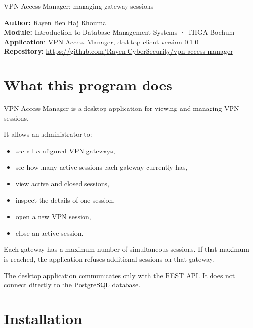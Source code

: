 \documentclass[11pt,a4paper]{article}
\begin{document}
\thispagestyle{empty}

%
{VPN Access Manager: managing gateway sessions}

\begin{infobox}
\textbf{Author:} Rayen Ben Haj Rhouma \\
\textbf{Module:} Introduction to Database Management Systems · THGA Bochum \\
\textbf{Application:} VPN Access Manager, desktop client version 0.1.0 \\
\textbf{Repository:} \url{https://github.com/Rayen-CyberSecurity/vpn-access-manager}
\end{infobox}

\tableofcontents
\vspace{1em}

\section{What this program does}

VPN Access Manager is a desktop application for viewing and managing VPN
sessions.

It allows an administrator to:

\begin{itemize}
    \item see all configured VPN gateways,
    \item see how many active sessions each gateway currently has,
    \item view active and closed sessions,
    \item inspect the details of one session,
    \item open a new VPN session,
    \item close an active session.
\end{itemize}

Each gateway has a maximum number of simultaneous sessions. If that maximum is
reached, the application refuses additional sessions on that gateway.

The desktop application communicates only with the REST API. It does not
connect directly to the PostgreSQL database.

\section{Installation}
\end{document}
